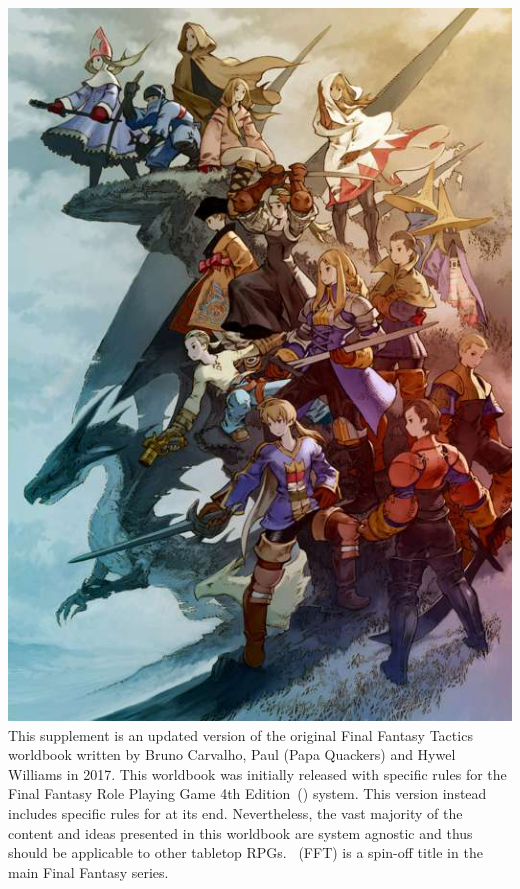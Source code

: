 %
\\\\
%
\includegraphics[width=\columnwidth]{./art/worldbook/everyone.jpg}
%
\ofpar
%
This supplement is an updated version of the original Final Fantasy Tactics worldbook written by Bruno Carvalho, Paul (Papa Quackers) and Hywel Williams in 2017.
This worldbook was initially released with specific rules for the Final Fantasy Role Playing Game 4th Edition~() system.
This version instead includes specific rules for  at its end.
Nevertheless, the vast majority of the content and ideas presented in this worldbook are system agnostic and thus should be applicable to other tabletop RPGs.
%
\ofpar
%
~(FFT) is a spin-off title in the main Final Fantasy series. 
